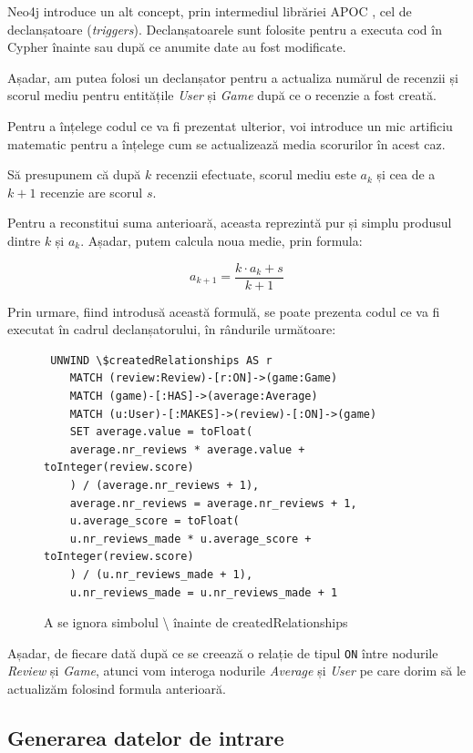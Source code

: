 \documentclass[12pt,a4paper]{report}
\begin{document}
Neo4j introduce un alt concept, prin intermediul librăriei APOC \cite{13}, cel de declanșatoare
(\emph{triggers}). \cite{14}
Declanșatoarele sunt folosite pentru a executa cod în Cypher înainte sau după ce anumite date au fost modificate.

Așadar, am putea folosi un declanșator pentru a actualiza numărul de recenzii și scorul mediu pentru entitățile \emph{User} și \emph{Game} după ce o recenzie a fost creată.

Pentru a înțelege codul ce va fi prezentat ulterior, voi introduce un mic artificiu matematic pentru a înțelege cum se actualizează media scorurilor în acest caz.

\bigskip

Să presupunem că după \( k \) recenzii efectuate, scorul mediu este \( a_k \) și cea de a \( k+1 \) recenzie are scorul \( s \).

Pentru a reconstitui suma anterioară, aceasta reprezintă pur și simplu produsul dintre \( k \) și \( a_k \). Așadar, putem calcula noua medie, prin formula: 

\[ a_{k+1} = \frac{k \cdot a_k + s}{k+1} \]

Prin urmare, fiind introdusă această formulă, se poate prezenta codul ce va fi executat în cadrul declanșatorului, în rândurile următoare:

\begin{figure}[h]
\centering
\begin{BVerbatim}
 UNWIND \$createdRelationships AS r 
    MATCH (review:Review)-[r:ON]->(game:Game)
    MATCH (game)-[:HAS]->(average:Average)
    MATCH (u:User)-[:MAKES]->(review)-[:ON]->(game)
    SET average.value = toFloat(
    average.nr_reviews * average.value + toInteger(review.score)
    ) / (average.nr_reviews + 1),
	average.nr_reviews = average.nr_reviews + 1,
    u.average_score = toFloat(
    u.nr_reviews_made * u.average_score + toInteger(review.score)
    ) / (u.nr_reviews_made + 1),
    u.nr_reviews_made = u.nr_reviews_made + 1
\end{BVerbatim}
\caption*{A se ignora simbolul \textbackslash{ } înainte de createdRelationships}
\end{figure}

Așadar, de fiecare dată după ce se creează o relație de tipul \texttt{ON} între nodurile \emph{Review} și \emph{Game}, atunci vom interoga nodurile \emph{Average} și \emph{User} pe care dorim să le actualizăm folosind formula anterioară.

\subsection{Generarea datelor de intrare}
\end{document}
